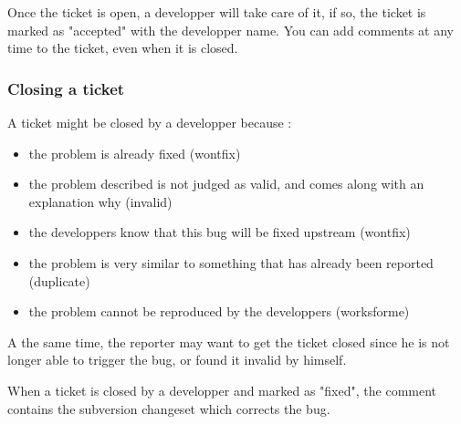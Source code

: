 Once the ticket is open, a developper will take care of it, if so, the ticket is marked as "accepted" with the developper name. You can add comments at any time to the ticket, even when it is closed.

\subsubsection{Closing a ticket}

A ticket might be closed by a developper because :

\begin{itemize}
\item the problem is already fixed (wontfix)
\item the problem described is not judged as valid, and comes along with an explanation why (invalid)
\item the developpers know that this bug will be fixed upstream (wontfix)
\item the problem is very similar to something that has already been reported (duplicate)
\item the problem cannot be reproduced by the developpers (worksforme)
\end{itemize}

A the same time, the reporter may want to get the ticket closed since he is not longer able to trigger the bug, or found it invalid by himself.

When a ticket is closed by a developper and marked as "fixed", the comment contains the subversion changeset which corrects the bug.